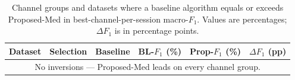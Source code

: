 \begin{table}[ht]
  \centering
  \caption{Channel groups and datasets where a baseline algorithm equals or exceeds Proposed-Med in best-channel-per-session macro-$F_1$. Values are percentages; $\Delta F_1$ is in percentage points.}
  \label{tab:exp2_inversions}
  \begin{tabular}{lllccc}
    \toprule
    Dataset & Selection & Baseline & BL-$F_1$ (\%) & Prop-$F_1$ (\%) & $\Delta F_1$ (pp) \\
    \midrule
    \multicolumn{6}{c}{No inversions --- Proposed-Med leads on every channel group.} \\
    \bottomrule
  \end{tabular}
\end{table}
